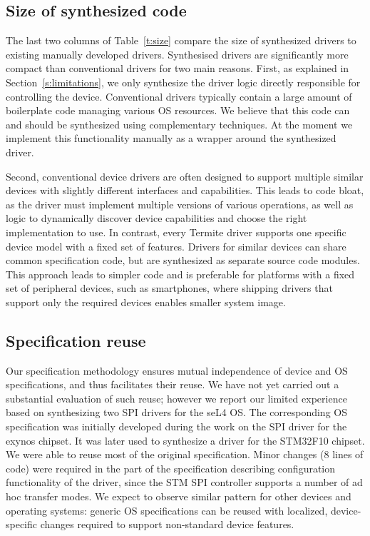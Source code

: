 \documentclass[a4paper,twoside,openright,11pt]{book}
\newcommand{\termite}{Termite\xspace}
\theoremstyle{definition}
\begin{document}
\subsection{Size of synthesized code} 
The last two columns of Table~\ref{t:size} compare the size of synthesized drivers to existing manually developed drivers.  Synthesised drivers are significantly more compact than conventional drivers for two main reasons.  First, as explained in Section~\ref{s:limitations}, we only synthesize the driver logic directly responsible for controlling the device.  Conventional drivers typically contain a large amount of boilerplate code managing various OS resources.  We believe that this code can and should be synthesized using complementary techniques.  At the moment we implement this functionality manually as a wrapper around the synthesized driver. 

Second, conventional device drivers are often designed to support multiple similar devices with slightly different interfaces and capabilities.  This leads to code bloat, as the driver must implement multiple versions of various operations, as well as logic to dynamically discover device capabilities and choose the right implementation to use.  In contrast, every \termite driver supports one specific device model with a fixed set of features.  Drivers for similar devices can share common specification code, but are synthesized as separate source code modules.  This approach leads to simpler code and is preferable for platforms with a fixed set of peripheral devices, such as smartphones, where shipping drivers that support only the required devices enables smaller system image.
  
\subsection{Specification reuse}  
Our specification methodology ensures mutual independence of device and OS specifications, and thus facilitates their reuse.  We have not yet carried out a substantial evaluation of such reuse; however we report our limited experience based on synthesizing two SPI drivers for the seL4 OS.  The corresponding OS specification was initially developed during the work on the SPI driver for the exynos chipset.  It was later used to synthesize a driver for the STM32F10 chipset.  We were able to reuse most of the original specification.  Minor changes (8 lines of code) were required in the part of the specification describing configuration functionality of the driver, since the STM SPI controller supports a number of ad hoc transfer modes.  We expect to observe similar pattern for other devices and operating systems: generic OS specifications can be reused with localized, device-specific changes required to support non-standard device features.
\end{document}
